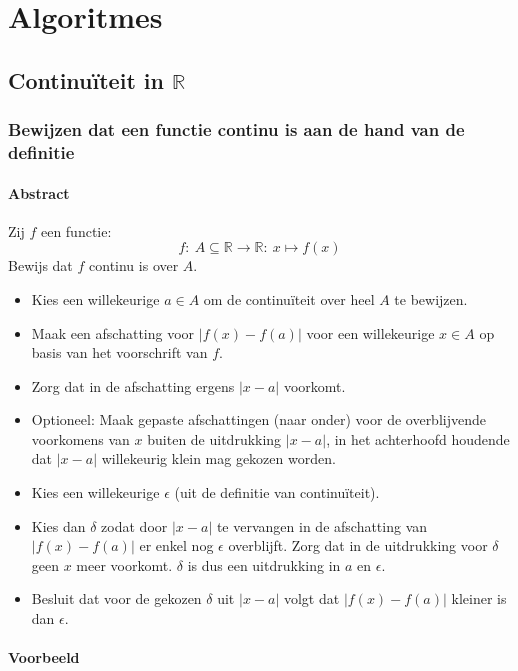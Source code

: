 \documentclass[main.tex]{subfiles}
\begin{document}
\chapter{Algoritmes}
\label{cha:algoritmes}

\section{Continu\"iteit in $\mathbb{R}$}
\label{sec:continuiteit-mathbbr}

\subsection{Bewijzen dat een functie continu is aan de hand van de definitie}
\label{sec:bewijzen-dat-een}

\subsubsection{Abstract}

Zij $f$ een functie:
\[ f:\ A \subseteq \mathbb{R} \rightarrow \mathbb{R}:\ x \mapsto f(x) \]
Bewijs dat $f$ continu is over $A$.

\begin{itemize}
\item Kies een willekeurige $a \in A$ om de continu\"iteit over heel $A$ te bewijzen.\needed
\item Maak een afschatting voor $|f(x)-f(a)|$ voor een willekeurige $x \in A$ op basis van het voorschrift van $f$.
\item Zorg dat in de afschatting ergens $|x-a|$ voorkomt.
\item Optioneel: Maak gepaste afschattingen (naar onder) voor de overblijvende voorkomens van $x$ buiten de uitdrukking $|x-a|$, in het achterhoofd houdende dat $|x-a|$ willekeurig klein mag gekozen worden.
\item Kies een willekeurige $\epsilon$ (uit de definitie van continu\"iteit).
\item Kies dan $\delta$ zodat door $|x-a|$ te vervangen in de afschatting van $|f(x)-f(a)|$ er enkel nog $\epsilon$ overblijft. Zorg dat in de uitdrukking voor $\delta$ geen $x$ meer voorkomt.
$\delta$ is dus een uitdrukking in $a$ en $\epsilon$.
\item Besluit dat voor de gekozen $\delta$ uit $|x-a|$ volgt dat $|f(x)-f(a)|$ kleiner is dan $\epsilon$.
\end{itemize}
\feed
\subsubsection{Voorbeeld}
\end{document}
